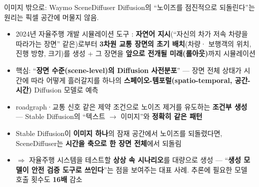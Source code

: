 \documentclass[aspectratio=169,11pt]{beamer}
\begin{document}
\begin{frame}{이미지 밖으로: Waymo SceneDiffuser}
  Diffusion의 ``노이즈를 점진적으로 되돌린다''는 원리는 픽셀 공간에
  머물지 않음.
  \begin{itemize}
    \item 2024년  자율주행 개발 시뮬레이션 도구
      :
      \textbf{자연어 지시}(``자신의 차가 저속 차량을 따라가는
      장면'' 같은)로부터 \textbf{3차원 교통 장면의 초기 배치}(차량·
      보행객의 위치, 진행 방향, 크기)를 생성 + 그 장면을
      \textbf{앞으로 전개될 미래(롤아웃)}까지 시뮬레이션
    \item 핵심: ``\textbf{장면 수준(scene-level)의 Diffusion
      사전분포}'' — 장면 전체 상태가 시간에 따라 어떻게 흘러갈지를
      하나의 \textbf{스페이오-템포럴(spatio-temporal, 공간-시간)}
      Diffusion 모델로 예측
    \item roadgraph·교통 신호 같은 제약 조건으로 노이즈 제거를 유도하는
      \textbf{조건부 생성} — Stable Diffusion의 ``텍스트 $\to$
      이미지''와 \textbf{정확히 같은 패턴}
    \item Stable Diffusion이 \textbf{이미지 하나}의 잠재 공간에서
      노이즈를 되돌렸다면, SceneDiffuser는 \textbf{시간을 축으로 한
      장면 전체}에서 되돌림
    \item $\Rightarrow$ 자율주행 시스템을 테스트할 \textbf{상상 속
      시나리오}를 대량으로 생성 — ``\textbf{생성 모델이 안전 검증
      도구로 쓰인다}''는 점을 보여주는 대표 사례.
      추론에 필요한 모델 호출 횟수도 \textbf{16배} 감소
  \end{itemize}
\end{frame}

\end{document}

